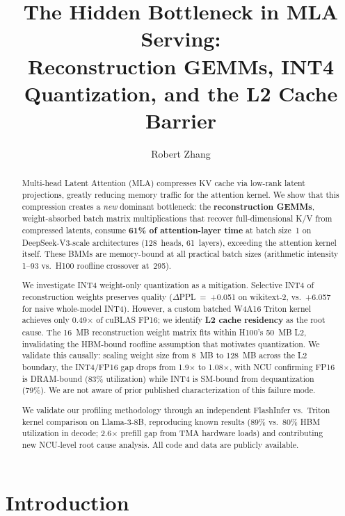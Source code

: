 \documentclass[10pt,twocolumn]{article}
\title{%
  \textbf{The Hidden Bottleneck in MLA Serving:}\\
  \textbf{Reconstruction GEMMs, INT4 Quantization, and the L2 Cache Barrier}
}
\author[1]{Robert Zhang} %
\affil[1]{Purdue University} %
\affil[1]{\texttt{zhan4808@purdue.edu}} %
\date{}
\begin{document}
\maketitle

\begin{abstract}
Multi-head Latent Attention (MLA) compresses KV cache via low-rank latent projections, greatly reducing memory traffic for the attention kernel.  We show that this compression creates a \emph{new} dominant bottleneck: the \textbf{reconstruction GEMMs}, weight-absorbed batch matrix multiplications that recover full-dimensional K/V from compressed latents, consume \textbf{61\% of attention-layer time} at batch size~1 on DeepSeek-V3-scale architectures (128~heads, 61~layers), exceeding the attention kernel itself.  These BMMs are memory-bound at all practical batch sizes (arithmetic intensity 1--93 vs.\ H100 roofline crossover at~295).

We investigate INT4 weight-only quantization as a mitigation.  Selective INT4 of reconstruction weights preserves quality ($\Delta$PPL~=~+0.051 on wikitext-2, vs.\ +6.057 for naive whole-model INT4).  However, a custom batched W4A16 Triton kernel achieves only 0.49$\times$ of cuBLAS FP16; we identify \textbf{L2 cache residency} as the root cause.  The 16~MB reconstruction weight matrix fits within H100's 50~MB L2, invalidating the HBM-bound roofline assumption that motivates quantization.  We validate this causally: scaling weight size from 8~MB to 128~MB across the L2 boundary, the INT4/FP16 gap drops from 1.9$\times$ to 1.08$\times$, with NCU confirming FP16 is DRAM-bound (83\% utilization) while INT4 is SM-bound from dequantization (79\%).  We are not aware of prior published characterization of this failure mode.

We validate our profiling methodology through an independent FlashInfer vs.\ Triton kernel comparison on Llama-3-8B, reproducing known results (89\% vs.\ 80\% HBM utilization in decode; 2.6$\times$ prefill gap from TMA hardware loads) and contributing new NCU-level root cause analysis.  All code and data are publicly available.
\end{abstract}

\section{Introduction}
\end{document}
